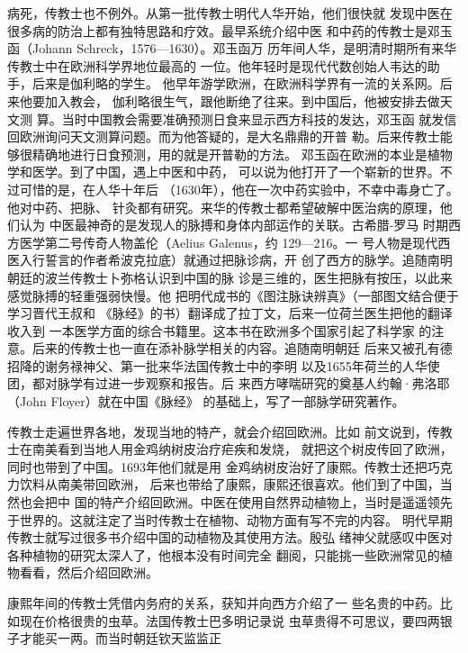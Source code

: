 病死，传教士也不例外。从第一批传教士明代人华开始，他们很快就%
发现中医在很多病的防治上都有独特思路和疗效。最早系统介绍中医%
和中药的传教士是邓玉函（Johann Schreck，1576—1630）。邓玉函万%
历年间人华，是明清时期所有来华传教士中在欧洲科学界地位最高的%
一位。他年轻时是现代代数创始人韦达的助手，后来是伽利略的学生。%
他早年游学欧洲，在欧洲科学界有一流的关系网。后来他要加入教会，%
伽利略很生气，跟他断绝了往来。到中国后，他被安排去做天文测%
算。当时中国教会需要准确预测日食来显示西方科技的发达，邓玉函%
就发信回欧洲询问天文测算问题。而为他答疑的，是大名鼎鼎的开普%
勒。后来传教士能够很精确地进行日食预测，用的就是开普勒的方法。%
邓玉函在欧洲的本业是植物学和医学。到了中国，遇上中医和中药，%
可以说为他打开了一个崭新的世界。不过可惜的是，在人华十年后%
（1630年），他在一次中药实验中，不幸中毒身亡了。他对中药、把脉、%
针灸都有研究。来华的传教士都希望破解中医治病的原理，他们认为%
中医最神奇的是发现人的脉搏和身体内部运作的关联。古希腊-罗马%
时期西方医学第二号传奇人物盖伦（Aelius Galenus，约 129—216。一%
号人物是现代西医入行誓言的作者希波克拉底）就通过把脉诊病，开%
创了西方的脉学。追随南明朝廷的波兰传教士卜弥格认识到中国的脉%
诊是三维的，医生把脉有按压，以此来感觉脉搏的轻重强弱快慢。他%
把明代成书的《图注脉诀辨真》（一部图文结合便于学习晋代王叔和%
《脉经》的书）翻译成了拉丁文，后来一位荷兰医生把他的翻译收入到%
一本医学方面的综合书籍里。这本书在欧洲多个国家引起了科学家%
的注意。后来的传教士也一直在添补脉学相关的内容。追随南明朝廷%
后来又被孔有德招降的谢务禄神父、第一批来华法国传教士中的李明%
以及1655年荷兰的人华使团，都对脉学有过进一步观察和报告。后%
来西方哮喘研究的奠基人约翰·弗洛耶（John Floyer）就在中国《脉经》%
的基础上，写了一部脉学研究著作。%
\par
传教士走遍世界各地，发现当地的特产，就会介绍回欧洲。比如%
前文说到，传教士在南美看到当地人用金鸡纳树皮治疗疟疾和发烧，%
就把这个树皮传回了欧洲，同时也带到了中国。1693年他们就是用%
金鸡纳树皮治好了康熙。传教士还把巧克力饮料从南美带回欧洲，%
后来也带给了康熙，康熙还很喜欢。他们到了中国，当然也会把中%
国的特产介绍回欧洲。中医在使用自然界动植物上，当时是遥遥领先%
于世界的。这就注定了当时传教士在植物、动物方面有写不完的内容。%
明代早期传教士就写过很多书介绍中国的动植物及其使用方法。殷弘%
绪神父就感叹中医对各种植物的研究太深人了，他根本没有时间完全%
翻阅，只能挑一些欧洲常见的植物看看，然后介绍回欧洲。%
\par
康熙年间的传教士凭借内务府的关系，获知并向西方介绍了一%
些名贵的中药。比如现在价格很贵的虫草。法国传教士巴多明记录说%
虫草贵得不可思议，要四两银子才能买一两。而当时朝廷钦天监监正%
